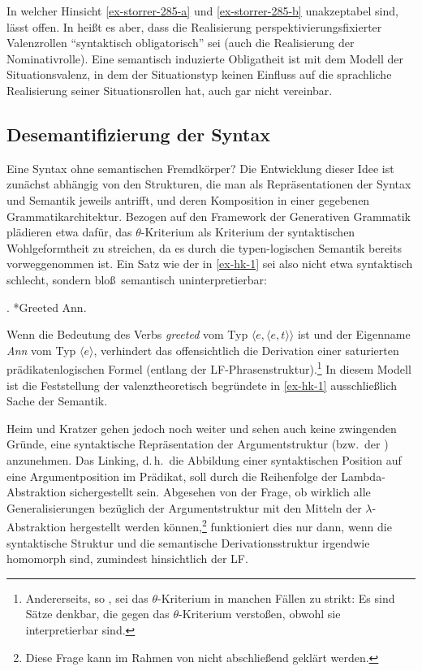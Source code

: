 {In welcher Hinsicht \ref{ex-storrer-285-a} und \ref{ex-storrer-285-b} unakzeptabel sind, lässt \cite{Storrer:92}  offen. In \citet[240]{Storrer:96} hei\ss t es aber, dass die Realisierung perspektivierungsfixierter Valenzrollen "`syntaktisch obligatorisch"' sei (auch die Realisierung der Nominativrolle). Eine semantisch induzierte Obligatheit ist mit dem Modell der Situationsvalenz, in dem der Situationstyp keinen Einfluss auf die sprachliche Realisierung seiner Situationsrollen hat, auch gar nicht vereinbar.    


\subsection{Desemantifizierung der Syntax}

Eine Syntax ohne semantischen Fremdkörper? Die Entwicklung dieser Idee ist zunächst abhängig von den Strukturen, die man als Repräsentationen der Syntax und Semantik jeweils antrifft, und deren Komposition in einer gegebenen Grammatikarchitektur. Bezogen auf den Framework der Generativen Grammatik plädieren etwa \citet[Kapitel~3]{Heim:Kratzer:98} dafür, das $\theta$-Kriterium als Kriterium der syntaktischen Wohlgeformtheit zu streichen, da es durch die typen-logischen Semantik bereits vorweggenommen ist. Ein Satz wie der in \ref{ex-hk-1} sei also nicht etwa syntaktisch schlecht, sondern blo\ss\  semantisch uninterpretierbar:

\ex. \label{ex-hk-1} *Greeted Ann.  \hfill \citep[50]{Heim:Kratzer:98}

Wenn die Bedeutung des Verbs {\it greeted} vom Typ $\langle e,\langle e,t \rangle \rangle$ ist und der Eigenname {\it Ann} vom Typ $\langle e \rangle$, verhindert das offensichtlich die Derivation einer saturierten prädikatenlogischen Formel (entlang der  LF-Phrasenstruktur).\footnote{Andererseits, so \citet[51f]{Heim:Kratzer:98}, sei das $\theta$-Kriterium in manchen Fällen zu strikt: Es sind Sätze denkbar, die gegen das $\theta$-Kriterium versto\ss en, obwohl sie interpretierbar sind.} In diesem Modell ist die Feststellung der valenztheoretisch begründete  in \ref{ex-hk-1} ausschlie\ss lich Sache der Semantik.

Heim und Kratzer gehen jedoch noch weiter und sehen auch keine zwingenden Gründe, eine syntaktische Repräsentation der Argumentstruktur (bzw.\ der ) anzunehmen. Das Linking, d.\,h.\ die Abbildung einer syntaktischen Position auf eine Argumentposition im Prädikat, soll durch die Reihenfolge der Lambda-Abstraktion sichergestellt sein. Abgesehen von der Frage, ob wirklich alle Generalisierungen bezüglich der Argumentstruktur mit den Mitteln der $\lambda$-Abstraktion hergestellt werden können,\footnote{Diese Frage kann im Rahmen von \cite{Heim:Kratzer:98} nicht abschlie\ss end geklärt werden.} funktioniert dies nur dann, wenn die syntaktische Struktur und die semantische Derivationsstruktur irgendwie homomorph sind, zumindest hinsichtlich der LF.  

}
